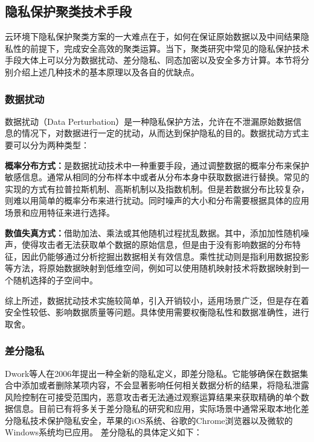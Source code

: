 \subsection{隐私保护聚类技术手段}
云环境下隐私保护聚类方案的一大难点在于，如何在保证原始数据以及中间结果隐私性的前提下，完成安全高效的聚类运算。当下，聚类研究中常见的隐私保护技术手段大体上可以分为数据扰动、差分隐私、同态加密以及安全多方计算。本节将分别介绍上述几种技术的基本原理以及各自的优缺点。

\subsubsection{数据扰动}
数据扰动（Data Perturbation）是一种隐私保护方法，允许在不泄漏原始数据信息的情况下，对数据进行一定的扰动，从而达到保护隐私的目的。数据扰动方式主要可以分为两种类型：

\begin{compactitem}
	\item \textbf{概率分布方式：}是数据扰动技术中一种重要手段，通过调整数据的概率分布来保护敏感信息。通常从相同的分布样本中或者从分布本身中获取数据进行替换。常见的实现的方式有拉普拉斯机制、高斯机制以及指数机制。但是若数据分布比较复杂，则难以用简单的概率分布来进行扰动。同时噪声的大小和分布需要根据具体的应用场景和应用特征来进行选择。
	\item \textbf{数值失真方式：}借助加法、乘法或其他随机过程扰乱数据。其中，添加加性随机噪声，使得攻击者无法获取单个数据的原始信息，但是由于没有影响数据的分布特征，因此仍能够通过分析挖掘出数据相关有效信息。乘性扰动则是指利用数据投影等方法，将原始数据映射到低维空间，例如可以使用随机映射技术将数据映射到一个随机选择的子空间中。
\end{compactitem}

综上所述，数据扰动技术实施较简单，引入开销较小，适用场景广泛，但是存在着安全性较低、影响数据质量等问题。具体使用需要权衡隐私性和数据准确性，进行取舍。

\subsubsection{差分隐私}
Dwork等人\cite{dwork2006differential}在2006年提出一种全新的隐私定义，即差分隐私。它能够确保在数据集合中添加或者删除某项内容，不会显著影响任何相关数据分析的结果\cite{dwork2008differential}，将隐私泄露风险控制在可接受范围内，恶意攻击者无法通过观察运算结果来获取精确的单个数据信息。目前已有将多关于差分隐私的研究和应用，实际场景中通常采取本地化差分隐私技术保护隐私安全，苹果的iOS系统\cite{team2017learning}、谷歌的Chrome浏览器\cite{erlingsson2014rappor}以及微软的Windows系统\cite{ding2017collecting}均已应用。
差分隐私的具体定义\cite{dwork2011firm}如下：

